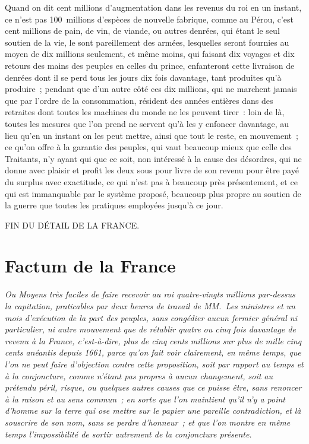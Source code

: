 \documentclass[french,twoside]{book} %
\newcommand\chapteropen{} %
\newcommand\chapterclose{} %
\begin{document}
Quand on dit cent millions d’augmentation dans les revenus du roi en un instant, ce n’est pas 100 millions d’espèces de nouvelle fabrique, comme au Pérou, c’est cent millions de pain, de vin, de viande, ou autres denrées, qui étant le seul soutien de la vie, le sont pareillement des armées, lesquelles seront fournies au moyen de dix millions seulement, et même moins, qui faisant dix voyages et dix retours des mains des peuples en celles du prince, enfanteront cette livraison de denrées dont il se perd tous les jours dix fois davantage, tant produites qu’à produire ; pendant que d’un autre côté ces dix millions, qui ne marchent jamais que par l’ordre de la consommation, résident des années entières dans des retraites dont toutes les machines du monde ne les peuvent tirer : loin de là, toutes les mesures que l’on prend ne servent qu’à les y enfoncer davantage, au lieu qu’en un instant on les peut mettre, ainsi que tout le reste, en mouvement ; ce qu’on offre à la garantie des peuples, qui vaut beaucoup mieux que celle des Traitants, n’y ayant qui que ce soit, non intéressé à la cause des désordres, qui ne donne avec plaisir et profit les deux sous pour livre de son revenu pour être payé du surplus avec exactitude, ce qui n’est pas à beaucoup près présentement, et ce qui est immanquable par le système proposé, beaucoup plus propre au soutien de la guerre que toutes les pratiques employées jusqu’à ce jour.\par


\begin{raggedleft}FIN DU DÉTAIL DE LA FRANCE.\end{raggedleft}
\chapterclose


\chapteropen
\chapter[{Factum de la France}]{Factum de la France}\renewcommand{\leftmark}{Factum de la France}

\begin{center}\emph{Ou Moyens très faciles de faire recevoir au roi quatre-vingts millions par-dessus la capitation, praticables par deux heures de travail de MM. Les ministres et un mois d’exécution de la part des peuples, sans congédier aucun fermier général ni particulier, ni autre mouvement que de rétablir quatre ou cinq fois davantage de revenu à la France, c’est-à-dire, plus de cinq cents millions sur plus de mille cinq cents anéantis depuis 1661, parce qu’on fait voir clairement, en même temps, que l’on ne peut faire d’objection contre cette proposition, soit par rapport au temps et à la conjoncture, comme n’étant pas propres à aucun changement, soit au prétendu péril, risque, ou quelques autres causes que ce puisse être, sans renoncer à la raison et au sens commun ; en sorte que l’on maintient qu’il n’y a point d’homme sur la terre qui ose mettre sur le papier une pareille contradiction, et là souscrire de son nom, sans se perdre d’honneur ; et que l’on montre en même temps l’impossibilité de sortir autrement de la conjoncture présente.}\end{center}
\end{document}
